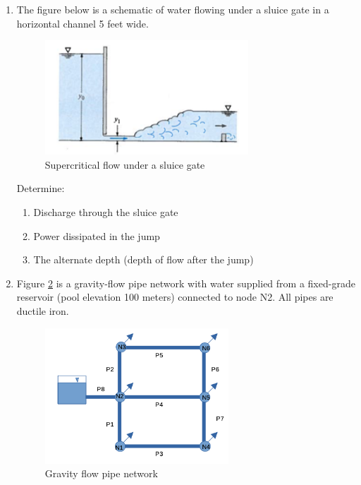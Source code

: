 \documentclass[12pt]{article}
\begin{document}
\begin{enumerate}
\item The figure below is a schematic of water flowing under a sluice gate in a horizontal channel 5 feet wide.

\begin{figure}[htbp] %
   \centering
   \includegraphics[width=3in]{sluicegate.png} 
   \caption{Supercritical flow under a sluice gate}
   \label{fig:venturiflow}
\end{figure}

Determine:
\begin{enumerate}
\item Discharge through the sluice gate
\item Power dissipated in the jump
\item The alternate depth (depth of flow after the jump)
\end{enumerate}

\clearpage

\item Figure \ref{fig:pipe-network} is a gravity-flow pipe network with water supplied from a fixed-grade reservoir (pool elevation 100 meters) connected to node N2.  All pipes are ductile iron.

\begin{figure}[htbp] %
   \centering
   \includegraphics[height=2in]{pipe-network.png} 
   \caption{Gravity flow pipe network}
   \label{fig:pipe-network}
\end{figure}


\end{enumerate}
\end{document}

